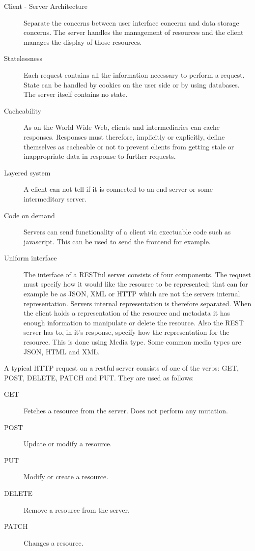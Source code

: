 \begin{description}
\item[ Client - Server Architecture ] Separate the concerns between user
interface concerns and data storage concerns. The server handles the management
of resources and the client manages the display of those resources.
\item[Statelessness] Each request contains all the information necessary to
perform a request. State can be handled by cookies on the user side or by using
databases. The server itself contains no state.
\item[Cacheability] As on the World Wide Web, clients and intermediaries can
cache responses. Responses must therefore, implicitly or explicitly, define
themselves as cacheable or not to prevent clients from getting stale or
inappropriate data in response to further requests. 
\item[Layered system] A client can not tell if it is connected to an end server
or some intermeditary server. 
\item[Code on demand] Servers can send functionality of a client via exectuable
code such as javascript. This can be used to send the frontend for example.
\item[Uniform interface] The interface of a RESTful server consists of four
components. The request must specify how it would like the resource to be
represented; that can for example be as JSON, XML or HTTP which are not the
servers internal representation. Servers internal representation is therefore
separated. When the client holds a representation of the resource and metadata
it has enough information to manipulate or delete the resource. Also the REST
server has to, in it's response, specify how the representation for the
resource. This is done using Media type. Some common media types are JSON, HTML
and XML.
\end{description}

A typical HTTP request on a restful server consists of one of the  verbs: GET,
POST, DELETE, PATCH and PUT. They are used as follows:

\begin{description}
\item[GET] Fetches a resource from the server. Does not perform any mutation. 
\item[POST] Update or modify a resource.
\item[PUT] Modify or create a resource.
\item[DELETE] Remove a resource from the server.
\item[PATCH] Changes a resource.
\end{description}


